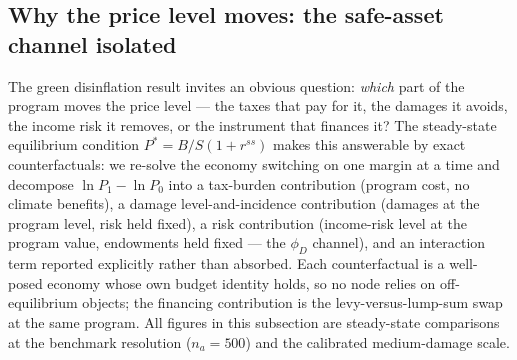 \documentclass[12pt]{article}
\begin{document}
\subsection{Why the price level moves: the safe-asset channel isolated}
\label{subsec:safeasset}

The green disinflation result invites an obvious question: \emph{which}
part of the program moves the price level --- the taxes that pay for it,
the damages it avoids, the income risk it removes, or the instrument that
finances it? The steady-state equilibrium condition $P^{*} = B/S(1+r^{ss})$
makes this answerable by exact counterfactuals: we re-solve the economy
switching on one margin at a time and decompose
$\ln P_1 - \ln P_0$ into a tax-burden contribution (program cost, no
climate benefits), a damage level-and-incidence contribution (damages at
the program level, risk held fixed), a risk contribution (income-risk
level at the program value, endowments held fixed --- the $\phi_D$
channel), and an interaction term reported explicitly rather than absorbed.
Each counterfactual is a well-posed economy whose own budget identity
holds, so no node relies on off-equilibrium objects; the financing
contribution is the levy-versus-lump-sum swap at the same program. All
figures in this subsection are steady-state comparisons at the benchmark
resolution ($n_a = 500$) and the calibrated medium-damage scale.
\end{document}
